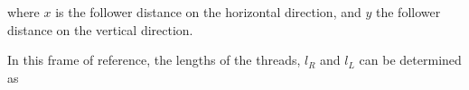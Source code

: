 \documentclass[journal]{IEEEtran}
\begin{document}
%
%

\noindent where $x$ is the follower distance on the horizontal direction, and $y$ the follower distance on the vertical direction.

In this frame of reference, the lengths of the threads, $l_R$ and $l_L$ can be determined as


\begin{figure}[]
    \centering

\begin{tikzpicture}[x=0.75pt,y=0.75pt,yscale=-1,xscale=1]


\end{tikzpicture}
\end{figure}
\end{document}
